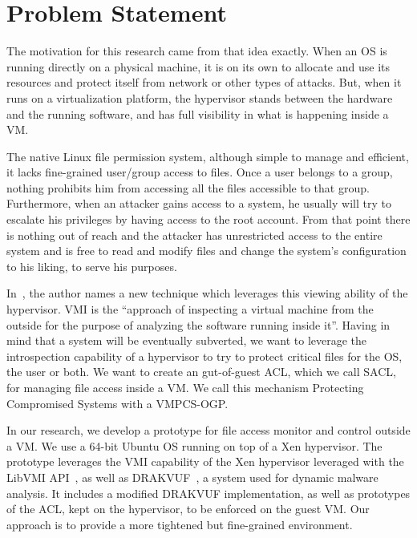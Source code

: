 \section{Problem Statement}\label{sec:problem} The motivation for this research came from that idea exactly. When an \ac{OS} is running directly on a physical machine, it is on its own to allocate and use its resources and protect itself from network or other types of attacks. But, when it runs on a virtualization platform, the hypervisor stands between the hardware and the running software, and has full visibility in what is happening inside a \ac{VM}. 

\par The native Linux file permission system, although simple to manage and efficient, it lacks fine-grained user/group access to files. Once a user belongs to a group, nothing prohibits him from accessing all the files accessible to that group. Furthermore, when an attacker gains access to a system, he usually will try to escalate his privileges by having access to the root account. From that point there is nothing out of reach and the attacker has unrestricted access to the entire system and is free to read and modify files and change the system's configuration to his liking, to serve his purposes.

\par In~\cite{garfinkel2003virtual}, the author names a new technique which leverages this viewing ability of the hypervisor. \ac{VMI} is the “approach of inspecting a virtual machine from the outside for the purpose of analyzing the software running inside it”. Having in mind that a system will be eventually subverted, we want to leverage the introspection capability of a hypervisor to try to protect critical files for the OS, the user or both. We want to create an gut-of-guest \ac{ACL}, which we call \ac{SACL}, for managing file access inside a VM. We call this mechanism Protecting Compromised Systems with a \ac{VMPCS-OGP}.

\par In our research, we develop a prototype for file access monitor and control outside a \ac{VM}. We use a 64-bit Ubuntu OS running on top of a Xen hypervisor. The prototype leverages the \ac{VMI} capability of the Xen hypervisor leveraged with the LibVMI \ac{API}~\cite{payne2011libvmi}, as well as DRAKVUF~\cite{lengyel2014drakvuf}, a system used for dynamic malware analysis. It includes a modified DRAKVUF implementation, as well as prototypes of the \ac{ACL}, kept on the hypervisor, to be enforced on the guest \ac{VM}. Our approach is to provide a more tightened but fine-grained environment.

